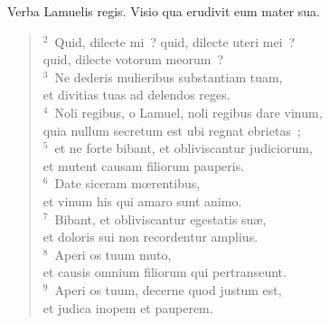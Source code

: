 \bchapter
\lettrine[lines=3,image=true,loversize=0.05,lraise=-0.03]{V}{}erba Lamuelis regis. Visio qua erudivit eum mater sua.
\begin{flushleft}\begin{verse}\vspace{6pt}${}^{2}$~Quid, dilecte mi~? quid, dilecte uteri mei~?\\ quid, dilecte votorum meorum~?\\
${}^{3}$~Ne dederis mulieribus substantiam tuam,\\ et divitias tuas ad delendos reges.\\
${}^{4}$~Noli regibus, o Lamuel, noli regibus dare vinum,\\ quia nullum secretum est ubi regnat ebrietas~;\\
${}^{5}$~et ne forte bibant, et obliviscantur judiciorum,\\ et mutent causam filiorum pauperis.\\
${}^{6}$~Date siceram mœrentibus,\\ et vinum his qui amaro sunt animo.\\
${}^{7}$~Bibant, et obliviscantur egestatis su\ae ,\\ et doloris sui non recordentur amplius.\\
${}^{8}$~Aperi os tuum muto,\\ et causis omnium filiorum qui pertranseunt.\\
${}^{9}$~Aperi os tuum, decerne quod justum est,\\ et judica inopem et pauperem.\end{verse}\end{flushleft}


